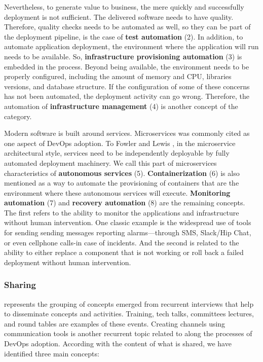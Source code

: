 Nevertheless, to generate value to business, the mere quickly and successfully
deployment is not sufficient. The delivered software needs to have quality.
Therefore, quality checks needs to be automated as well, so they can be part of the
deployment pipeline, is the case of \textbf{test automation} (2). In addition, to
automate application deployment, the environment where the
application will run needs to be available. So, \textbf{infrastructure
provisioning automation} (3) is embedded in the process. Beyond being available,
the environment needs to be properly configured, including the amount of memory and CPU,
libraries versions, and database structure. If the configuration of some of these concerns
has not been automated, the deployment activity can go wrong. Therefore,
the automation of \textbf{infrastructure management} (4) is another
concept of the  category.

Modern software is built around services. Microservices  was commonly cited
as one aspect of DevOps adoption. To Fowler and Lewis
\cite{martinfowler2014microservices}, in the
microservice architectural style, services need to be independently deployable
by fully automated deployment machinery. We call this part of microservices
characteristics of \textbf{autonomous services} (5). \textbf{Containerization}
(6) is also mentioned as a way to automate the provisioning of containers that are the
environment where these autonomous services will execute.
\textbf{Monitoring automation} (7) and \textbf{recovery automation} (8) are the
remaining concepts. The first refers to the ability to monitor the
applications and infrastructure without human intervention. One classic example
is the widespread use of tools for sending sending messages reporting
alarms---through SMS, Slack/Hip Chat, or even
cellphone calls-in case of incidents. And the second is related to the ability
to either replace a component that is not working or
roll back a failed deployment without human intervention.

\subsubsection*{{\bf Sharing}} represents the grouping of concepts
emerged from recurrent interviews that help to disseminate concepts and
activities. Training, tech talks, committees lectures, and round tables
are examples of these events. Creating
channels using communication tools is another recurrent topic
related to  along the processes of DevOps adoption.
According with the content of what is shared, we
have identified three main concepts:

